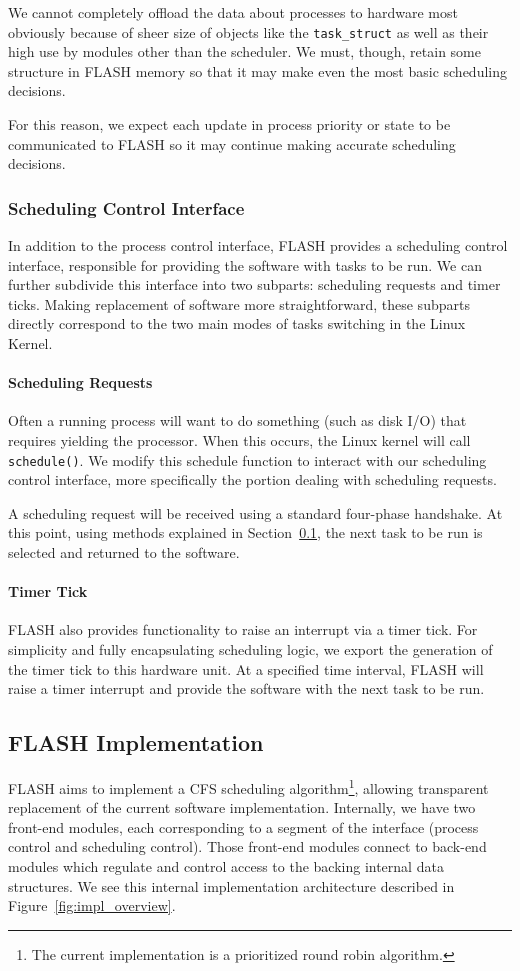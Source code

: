 \documentclass{sig-alternate-10pt}
\newcommand{\ttt}{\texttt}
\begin{document}
We cannot completely offload the data about processes to hardware most
obviously because of sheer size of objects like the \ttt{task\_struct} as
well as their high use by modules other than the scheduler.  We must,
though, retain some structure in FLASH memory so that it may make even the
most basic scheduling decisions.

For this reason, we expect each update in process priority or state to be
communicated to FLASH so it may continue making accurate scheduling
decisions.

\subsubsection{Scheduling Control Interface}
In addition to the process control interface, FLASH provides a scheduling
control interface, responsible for providing the software with tasks to be
run.  We can further subdivide this interface into two subparts: scheduling
requests and timer ticks.  Making replacement of software more
straightforward, these subparts directly correspond to the two main modes of
tasks switching in the Linux Kernel.

\paragraph{Scheduling Requests}
Often a running process will want to do something (such as disk I/O) that
requires yielding the processor.  When this occurs, the Linux kernel will
call \texttt{schedule()}.  We modify this schedule function to interact with
our scheduling control interface, more specifically the portion dealing with
scheduling requests.

A scheduling request will be received using a standard four-phase handshake.
At this point, using methods explained in Section~\ref{sec:FLASH_impl}, the
next task to be run is selected and returned to the software.

\paragraph{Timer Tick}
FLASH also provides functionality to raise an interrupt via a timer tick.
For simplicity and fully encapsulating scheduling logic, we export the
generation of the timer tick to this hardware unit.  At a specified time
interval, FLASH will raise a timer interrupt and provide the software with
the next task to be run.

\subsection{FLASH Implementation}
\label{sec:FLASH_impl}
FLASH aims to implement a CFS scheduling algorithm\footnote{The current
implementation is a prioritized round robin algorithm.}, allowing
transparent replacement of the current software implementation.  Internally,
we have two front-end modules, each corresponding to a segment of the
interface (process control and scheduling control). Those front-end modules
connect to back-end modules which regulate and control access to the backing
internal data structures.  We see this internal implementation architecture
described in Figure~\ref{fig:impl_overview}.
\end{document}

